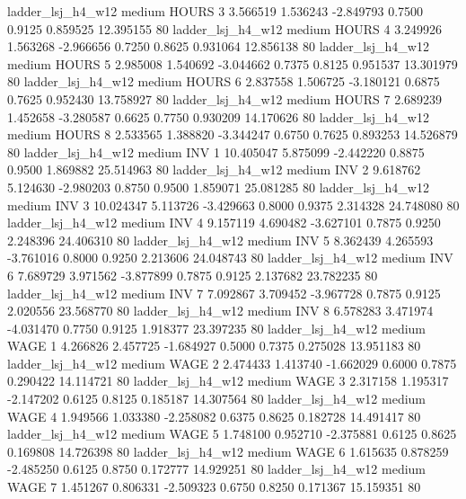      ladder_lsj_h4_w12     medium    HOURS                 3  3.566519 1.536243 -2.849793 0.7500 0.9125  0.859525   12.395155 80
     ladder_lsj_h4_w12     medium    HOURS                 4  3.249926 1.563268 -2.966656 0.7250 0.8625  0.931064   12.856138 80
     ladder_lsj_h4_w12     medium    HOURS                 5  2.985008 1.540692 -3.044662 0.7375 0.8125  0.951537   13.301979 80
     ladder_lsj_h4_w12     medium    HOURS                 6  2.837558 1.506725 -3.180121 0.6875 0.7625  0.952430   13.758927 80
     ladder_lsj_h4_w12     medium    HOURS                 7  2.689239 1.452658 -3.280587 0.6625 0.7750  0.930209   14.170626 80
     ladder_lsj_h4_w12     medium    HOURS                 8  2.533565 1.388820 -3.344247 0.6750 0.7625  0.893253   14.526879 80
     ladder_lsj_h4_w12     medium      INV                 1 10.405047 5.875099 -2.442220 0.8875 0.9500  1.869882   25.514963 80
     ladder_lsj_h4_w12     medium      INV                 2  9.618762 5.124630 -2.980203 0.8750 0.9500  1.859071   25.081285 80
     ladder_lsj_h4_w12     medium      INV                 3 10.024347 5.113726 -3.429663 0.8000 0.9375  2.314328   24.748080 80
     ladder_lsj_h4_w12     medium      INV                 4  9.157119 4.690482 -3.627101 0.7875 0.9250  2.248396   24.406310 80
     ladder_lsj_h4_w12     medium      INV                 5  8.362439 4.265593 -3.761016 0.8000 0.9250  2.213606   24.048743 80
     ladder_lsj_h4_w12     medium      INV                 6  7.689729 3.971562 -3.877899 0.7875 0.9125  2.137682   23.782235 80
     ladder_lsj_h4_w12     medium      INV                 7  7.092867 3.709452 -3.967728 0.7875 0.9125  2.020556   23.568770 80
     ladder_lsj_h4_w12     medium      INV                 8  6.578283 3.471974 -4.031470 0.7750 0.9125  1.918377   23.397235 80
     ladder_lsj_h4_w12     medium     WAGE                 1  4.266826 2.457725 -1.684927 0.5000 0.7375  0.275028   13.951183 80
     ladder_lsj_h4_w12     medium     WAGE                 2  2.474433 1.413740 -1.662029 0.6000 0.7875  0.290422   14.114721 80
     ladder_lsj_h4_w12     medium     WAGE                 3  2.317158 1.195317 -2.147202 0.6125 0.8125  0.185187   14.307564 80
     ladder_lsj_h4_w12     medium     WAGE                 4  1.949566 1.033380 -2.258082 0.6375 0.8625  0.182728   14.491417 80
     ladder_lsj_h4_w12     medium     WAGE                 5  1.748100 0.952710 -2.375881 0.6125 0.8625  0.169808   14.726398 80
     ladder_lsj_h4_w12     medium     WAGE                 6  1.615635 0.878259 -2.485250 0.6125 0.8750  0.172777   14.929251 80
     ladder_lsj_h4_w12     medium     WAGE                 7  1.451267 0.806331 -2.509323 0.6750 0.8250  0.171367   15.159351 80

